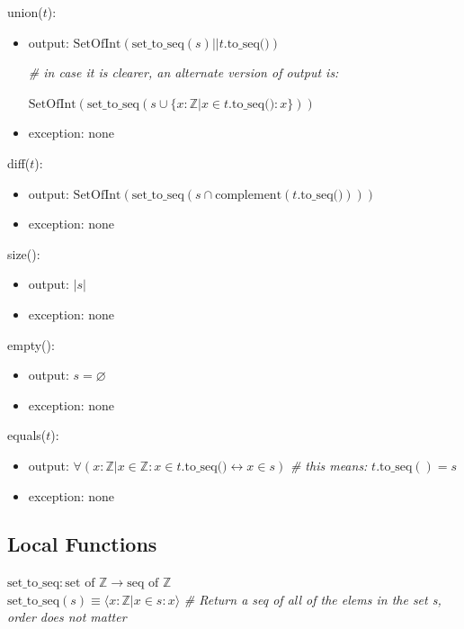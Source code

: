 \documentclass[12pt,fleqn]{examtst}
\begin{document}
\noindent union($t$):
\begin{itemize}
\item output: $\text{SetOfInt} (\mbox{set\_to\_seq}(s) ||
  t.\text{to\_seq()})$

  \textit{\# in case it is clearer, an alternate version of output is:}
  
  $\text{SetOfInt}(\text{set\_to\_seq}(s \cup \{x: \mathbb{Z} | x \in t.\text{to\_seq()} : x \}))$
  
\item exception: none
\end{itemize}

\noindent diff($t$):
\begin{itemize}
\item output:
  $\text{SetOfInt}( \text{set\_to\_seq} (s \cap \text{complement}(t.\text{to\_seq()})))$
  
\item exception: none
\end{itemize}

\noindent size():
\begin{itemize}
\item output: $| s |$
\item exception: none
\end{itemize}

\noindent empty():
\begin{itemize}
\item output: $s = \varnothing$
\item exception: none
\end{itemize}

\noindent equals($t$):
\begin{itemize}
\item output: $\forall ( x: \mathbb{Z} | x \in \mathbb{Z} : x \in
  t.\text{to\_seq()} \leftrightarrow x \in s)$ \textit{\# this means:} $t.\text{to\_seq}() = s$
\item exception: none
\end{itemize}

\subsection*{Local Functions}

\noindent $\mbox{set\_to\_seq}: \text{set of } \mathbb{Z} \rightarrow \mbox{seq of }
\mathbb{Z}$\\
\noindent
$\mbox{set\_to\_seq}(s) \equiv \langle x: \mathbb{Z} | x \in s : x \rangle$
\textit{\# Return a seq of all of the elems in the set s, order does not matter}\\
\end{document}
